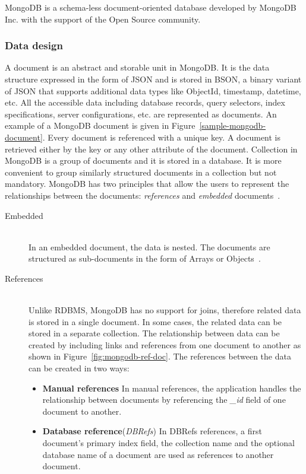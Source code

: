 MongoDB is a schema-less document-oriented database developed by MongoDB Inc. with the support of the Open Source community. 
\subsubsection{Data design} 
	A document is an abstract and storable unit in MongoDB. It is the data structure expressed in the form of JSON and is stored in BSON, a binary variant of JSON that supports additional data types like ObjectId, timestamp, datetime, etc. All the accessible data including database records, query selectors, index specifications, server configurations, etc. are represented as documents. An example of a  MongoDB document is given in Figure~\ref{sample-mongodb-document}.
Every document is referenced with a unique key. A document is retrieved either by the key or any other attribute of the document. Collection in MongoDB is a group of documents and it is stored in a database. It is more convenient to group similarly structured documents in a collection but not mandatory. MongoDB has two principles that allow the users to represent the relationships between the documents: \textit{references} and \textit{embedded} documents~\citep{mongodb:org}. 
\begin{description}
\item[Embedded]\label{mongo:embedded} \hfill \\
    In an embedded document, the data is nested. The documents are structured as sub-documents in the form of Arrays or Objects~\citep{nosql/comparision}. 
    \item[References] \hfill \\
    Unlike RDBMS, MongoDB has no support for joins, therefore related data is stored in a single document. In some cases, the related data can be stored in a separate collection. The relationship between data can be created by including links and references from one document to another as shown in Figure~\ref{fig:mongodb-ref-doc}.  The references between the data can be created in two ways:
\begin{itemize}
	\item {\textbf{Manual references}}
		In manual references, the application handles the relationship between documents by referencing the \textit{\_id} field of one document to another. 
	\item \textbf{Database reference}(\textit{DBRefs})
	In  DBRefs references, a first document's primary index field, the collection name and the optional database name of a document are used as references to another document.
\end{itemize}



\end{description}

